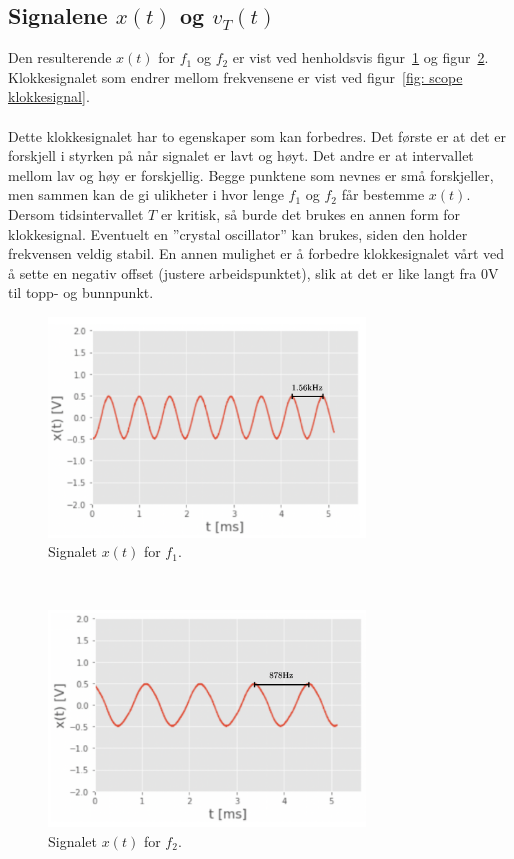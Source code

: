 \documentclass[a4paper,11pt,norsk]{article}
\begin{document}
\subsection{Signalene $x(t)$ og $v_T(t)$}
Den resulterende $x(t)$ for $f_1$ og $f_2$ er vist ved henholdsvis figur~\ref{fig: scope f_1} og figur~\ref{fig: scope f_2}. Klokkesignalet som endrer mellom frekvensene er vist ved figur~\ref{fig: scope klokkesignal}. 
\\\\
Dette klokkesignalet har to egenskaper som kan forbedres. Det første er at det er forskjell i styrken på når signalet er lavt og høyt. Det andre er at intervallet mellom lav og høy er forskjellig. Begge punktene som nevnes er små forskjeller, men sammen kan de gi ulikheter i hvor lenge $f_1$ og $f_2$ får bestemme $x(t)$. Dersom tidsintervallet $T$ er kritisk, så burde det brukes en annen form for klokkesignal. Eventuelt en ''crystal oscillator'' kan brukes, siden den holder frekvensen veldig stabil.
En annen mulighet er å forbedre klokkesignalet vårt ved å sette en negativ offset (justere arbeidspunktet), slik at det er like langt fra 0V til topp- og bunnpunkt.
\\
\begin{figure}[!htbp]
    \centering
    \includegraphics[width=0.75\textwidth]{img/Scope1_complete.png}
    \caption{Signalet $x(t)$ for $f_1$.}
    \label{fig: scope f_1}
\end{figure} \\
\begin{figure}[!htbp]
    \centering
    \includegraphics[width=0.75\textwidth]{img/Scope2_complete.png}
    \caption{Signalet $x(t)$ for $f_2$.}
    \label{fig: scope f_2}
\end{figure} \\
\end{document}
